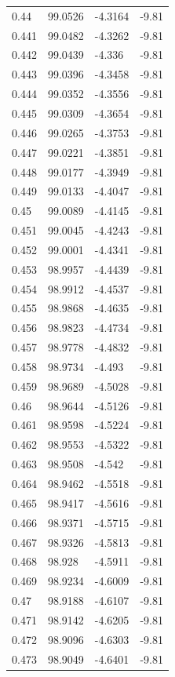 \begin{tabular}{llll}
0.44 & 99.0526 & -4.3164 & -9.81 \\
0.441 & 99.0482 & -4.3262 & -9.81 \\
0.442 & 99.0439 & -4.336 & -9.81 \\
0.443 & 99.0396 & -4.3458 & -9.81 \\
0.444 & 99.0352 & -4.3556 & -9.81 \\
0.445 & 99.0309 & -4.3654 & -9.81 \\
0.446 & 99.0265 & -4.3753 & -9.81 \\
0.447 & 99.0221 & -4.3851 & -9.81 \\
0.448 & 99.0177 & -4.3949 & -9.81 \\
0.449 & 99.0133 & -4.4047 & -9.81 \\
0.45 & 99.0089 & -4.4145 & -9.81 \\
0.451 & 99.0045 & -4.4243 & -9.81 \\
0.452 & 99.0001 & -4.4341 & -9.81 \\
0.453 & 98.9957 & -4.4439 & -9.81 \\
0.454 & 98.9912 & -4.4537 & -9.81 \\
0.455 & 98.9868 & -4.4635 & -9.81 \\
0.456 & 98.9823 & -4.4734 & -9.81 \\
0.457 & 98.9778 & -4.4832 & -9.81 \\
0.458 & 98.9734 & -4.493 & -9.81 \\
0.459 & 98.9689 & -4.5028 & -9.81 \\
0.46 & 98.9644 & -4.5126 & -9.81 \\
0.461 & 98.9598 & -4.5224 & -9.81 \\
0.462 & 98.9553 & -4.5322 & -9.81 \\
0.463 & 98.9508 & -4.542 & -9.81 \\
0.464 & 98.9462 & -4.5518 & -9.81 \\
0.465 & 98.9417 & -4.5616 & -9.81 \\
0.466 & 98.9371 & -4.5715 & -9.81 \\
0.467 & 98.9326 & -4.5813 & -9.81 \\
0.468 & 98.928 & -4.5911 & -9.81 \\
0.469 & 98.9234 & -4.6009 & -9.81 \\
0.47 & 98.9188 & -4.6107 & -9.81 \\
0.471 & 98.9142 & -4.6205 & -9.81 \\
0.472 & 98.9096 & -4.6303 & -9.81 \\
0.473 & 98.9049 & -4.6401 & -9.81 \\

\end{tabular}
